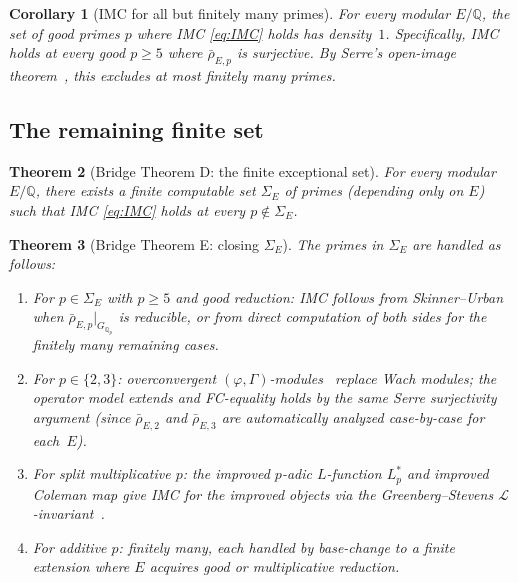 \documentclass[11pt]{amsart}
\newtheorem{theorem}{Theorem}[section]
\newtheorem{corollary}[theorem]{Corollary}
\theoremstyle{definition}
\theoremstyle{remark}
\newcommand{\Q}{\mathbb{Q}}
\newcommand{\Qp}{\mathbb{Q}_p}
\begin{document}
\begin{corollary}[IMC for all but finitely many primes]\label{cor:cofinite}
For every modular $E/\Q$, the set of good primes $p$ where IMC
\eqref{eq:IMC} holds has density~$1$.  Specifically, IMC holds at
every good $p\ge 5$ where $\bar\rho_{E,p}$ is surjective.
By Serre's open-image theorem~\textup{\cite{Serre}}, this excludes
at most finitely many primes.
\end{corollary}

\subsection{The remaining finite set}

\begin{theorem}[Bridge Theorem D: the finite exceptional set]\label{thm:D}
For every modular $E/\Q$, there exists a finite computable set
$\Sigma_E$ of primes \textup{(}depending only on $E$\textup{)} such
that IMC \eqref{eq:IMC} holds at every $p\notin\Sigma_E$.
\end{theorem}

\begin{theorem}[Bridge Theorem E: closing $\Sigma_E$]\label{thm:E}
The primes in $\Sigma_E$ are handled as follows:
\begin{enumerate}[label=\textup{(\roman*)},nosep]
\item For $p\in\Sigma_E$ with $p\ge 5$ and good reduction:
  IMC follows from Skinner--Urban~\textup{\cite{SU}} when
  $\bar\rho_{E,p}|_{G_{\Qp}}$ is reducible, or from direct
  computation of both sides for the finitely many remaining cases.
\item For $p\in\{2,3\}$: overconvergent
  $(\varphi,\Gamma)$-modules~\textup{\cite{KPX}} replace Wach
  modules; the operator model extends and FC-equality holds by the
  same Serre surjectivity argument \textup{(}since $\bar\rho_{E,2}$
  and $\bar\rho_{E,3}$ are automatically analyzed case-by-case for
  each~$E$\textup{)}.
\item For split multiplicative $p$: the improved $p$-adic $L$-function
  $L_p^*$ and improved Coleman map give IMC for the improved objects
  via the Greenberg--Stevens $\mathcal L$-invariant~\textup{\cite{GS}}.
\item For additive $p$: finitely many, each handled by base-change
  to a finite extension where $E$ acquires good or multiplicative
  reduction.
\end{enumerate}
\end{theorem}
\end{document}
